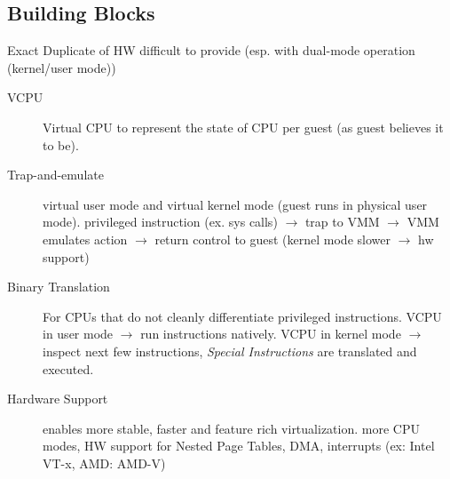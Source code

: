 \subsection*{Building Blocks}
Exact Duplicate of HW difficult to provide (esp. with dual-mode operation (kernel/user mode))
\begin{description}
    \item[VCPU]Virtual CPU to represent the state of CPU per guest (as guest believes it to be).  %
    \item[Trap-and-emulate] virtual user mode and virtual kernel mode (guest runs in physical user mode). privileged instruction (ex. sys calls) $\rightarrow$ trap to VMM $\rightarrow$ VMM emulates action $\rightarrow$ return control to guest (kernel mode slower $\rightarrow$ hw support)
    \item[Binary Translation] For CPUs that do not cleanly differentiate privileged instructions. VCPU in user mode $\rightarrow$  run instructions natively. VCPU in kernel mode $\rightarrow$ inspect next few instructions, \textit{Special Instructions} are translated and executed.
    \item[Hardware Support]enables more stable, faster and feature rich virtualization. more CPU modes, HW support for Nested Page Tables, DMA, interrupts (ex: Intel VT-x, AMD: AMD-V)
\end{description}

